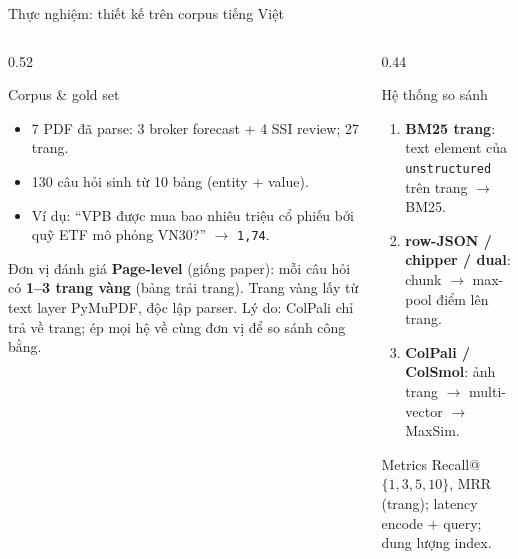 \documentclass[aspectratio=169,10pt]{beamer}
\begin{document}
\begin{frame}{Thực nghiệm: thiết kế trên corpus tiếng Việt}
  \begin{columns}[T]
    \begin{column}{0.52\textwidth}
      \begin{block}{\small Corpus \& gold set}
        \footnotesize
        \begin{itemize}
          \item 7 PDF đã parse: 3 broker forecast + 4 SSI review; 27 trang.
          \item 130 câu hỏi sinh từ 10 bảng (entity + value).
          \item Ví dụ: ``VPB được mua bao nhiêu triệu cổ phiếu bởi quỹ ETF mô phỏng VN30?'' $\rightarrow$ \texttt{1,74}.
        \end{itemize}
      \end{block}
      \begin{block}{\small Đơn vị đánh giá}
        \footnotesize
        \textbf{Page-level} (giống paper): mỗi câu hỏi có \textbf{1--3 trang vàng}
        (bảng trải trang). Trang vàng lấy từ text layer PyMuPDF, độc lập parser.
        Lý do: ColPali chỉ trả về trang; ép mọi hệ về cùng đơn vị để so sánh công bằng.
      \end{block}
    \end{column}
    \begin{column}{0.44\textwidth}
      \begin{block}{\small Hệ thống so sánh}
        \footnotesize
        \begin{enumerate}
          \item \textbf{BM25 trang}: text element của \texttt{unstructured} trên trang $\rightarrow$ BM25.
          \item \textbf{row-JSON / chipper / dual}: chunk $\rightarrow$ max-pool điểm lên trang.
          \item \textbf{ColPali / ColSmol}: ảnh trang $\rightarrow$ multi-vector $\rightarrow$ MaxSim.
        \end{enumerate}
      \end{block}
      \begin{block}{\small Metrics}
        \footnotesize
        Recall@$\{1,3,5,10\}$, MRR (trang); latency encode + query; dung lượng index.
      \end{block}
    \end{column}
  \end{columns}
\end{frame}
\end{document}
